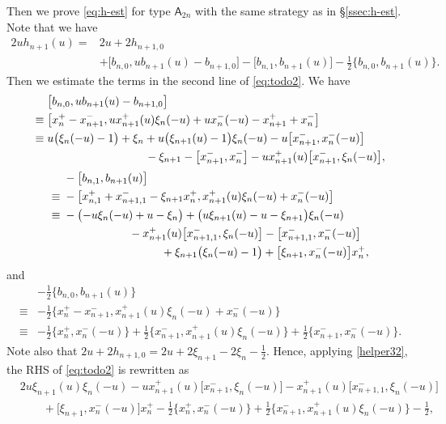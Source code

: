 \documentclass[11pt,reqno]{amsart}
\numberwithin{equation}{section}
\theoremstyle{definition}
\theoremstyle{remark}
\newcommand{\beq}{\begin{equation}}
\newcommand{\eeq}{\end{equation}}
\begin{document}
\subsubsection{}Then we prove \eqref{eq:h-est} for type $\mathsf A_{2n}$ with the same strategy as in \S\ref{ssec:h-est}. Note that we have
\beq\label{eq:todo2}
\begin{split}
2u h_{n+1}(u)
={}&
2u+2h_{n+1,0}\\
&+\bigl[b_{n,0},u b_{n+1}(u)-b_{n+1,0}\bigr]
-\bigl[b_{n,1},b_{n+1}(u)\bigr]
-\tfrac{1}{2}\bigl\{b_{n,0},b_{n+1}(u)\bigr\}.
\end{split}
\eeq
Then we estimate the terms in the second line of \eqref{eq:todo2}. We have
\begin{align*}
&\bigl[b_{n,0},u b_{n+1}(u)-b_{n+1,0}\bigr]\\
\equiv{}&
\bigl[
 x_n^+-x_{n+1}^-,
 u x_{n+1}^+(u)\xi_n(-u)+u x_n^-(-u)-x_{n+1}^++x_n^-
\bigr]\\
\equiv{}&
u\bigl(\xi_n(-u)-1\bigr)+\xi_n
+u\bigl(\xi_{n+1}(u)-1\bigr)\xi_n(-u)
-u\bigl[x_{n+1}^-,x_n^-(-u)\bigr]\\
&\hskip3.03cm
-\xi_{n+1}-\bigl[x_{n+1}^-,x_n^-\bigr]
-u x_{n+1}^+(u)\bigl[x_{n+1}^-,\xi_n(-u)\bigr],
\end{align*}
\begin{align*}
&-\bigl[b_{n,1},b_{n+1}(u)\bigr]\\
\equiv{}&
-\bigl[
 x_{n,1}^+ +x_{n+1,1}^- -\xi_{n+1}x_n^+,
 x_{n+1}^+(u)\xi_n(-u)+x_n^-(-u)
\bigr]\\
\equiv{}&
-\bigl(-u\xi_n(-u)+u-\xi_n\bigr)
+\bigl(u\xi_{n+1}(u)-u-\xi_{n+1}\bigr)\xi_n(-u)\\
&\hskip2.03cm
-x_{n+1}^+(u)\bigl[x_{n+1,1}^-,\xi_n(-u)\bigr]
-\bigl[x_{n+1,1}^-,x_n^-(-u)\bigr]\\
&\hskip3.03cm
+\xi_{n+1}\bigl(\xi_n(-u)-1\bigr)
+\bigl[\xi_{n+1},x_n^-(-u)\bigr]x_n^+,
\end{align*}
and
\begin{align*}
&-\tfrac12\bigl\{b_{n,0},b_{n+1}(u)\bigr\}\\
\equiv{}&-\tfrac12
\bigl\{
 x_n^+-x_{n+1}^-,
 x_{n+1}^+(u)\xi_n(-u)+x_n^-(-u)
\bigr\}\\
\equiv{}&
-\tfrac12\bigl\{x_n^+,x_n^-(-u)\bigr\}
+\tfrac12\bigl\{x_{n+1}^-,x_{n+1}^+(u)\xi_n(-u)\bigr\}
+\tfrac12\bigl\{x_{n+1}^-,x_n^-(-u)\bigr\}.
\end{align*}
Note also that $2u+2h_{n+1,0}=2u+2\xi_{n+1}-2\xi_n-\tfrac12$. Hence, applying \eqref{helper32}, the RHS of \eqref{eq:todo2} is rewritten as
\begin{align*}
&2u\xi_{n+1}(u)\xi_n(-u)
-u x_{n+1}^+(u)\bigl[x_{n+1}^-,\xi_n(-u)\bigr]
-x_{n+1}^+(u)\bigl[x_{n+1,1}^-,\xi_n(-u)\bigr]\\
&\qquad
+\bigl[\xi_{n+1},x_n^-(-u)\bigr]x_n^+
-\tfrac12 \{x_n^+,x_n^-(-u) \}
+\tfrac12 \{x_{n+1}^-,x_{n+1}^+(u)\xi_n(-u) \}
-\tfrac12,
\end{align*}
\end{document}

